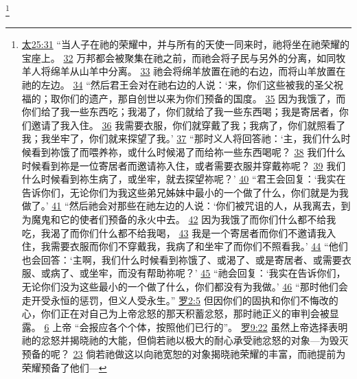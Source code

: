 \documentclass[12pt, a4paper, oneside]{ctexart}
\begin{document}
	\footnote {
		\href{https://biblehub.com/matthew/25-31.htm}{太25:31} “当人子在祂的荣耀中，并与所有的天使一同来时，祂将坐在祂荣耀的宝座上。
		\href{https://biblehub.com/matthew/25-32.htm}{32} 万邦都会被聚集在祂之前，而祂会将子民与另外的分离，如同牧羊人将绵羊从山羊中分离。
		\href{https://biblehub.com/matthew/25-33.htm}{33} 祂会将绵羊放置在祂的右边，而将山羊放置在祂的左边。
		\href{https://biblehub.com/matthew/25-34.htm}{34} “然后君王会对在祂右边的人说：‘来，你们这些被我的圣父祝福的；取你们的遗产，那自创世以来为你们预备的国度。
		\href{https://biblehub.com/matthew/25-35.htm}{35} 因为我饿了，而你们给了我一些东西吃；我渴了，你们就给了我一些东西喝；我是寄居者，你们邀请了我入住。
		\href{https://biblehub.com/matthew/25-36.htm}{36} 我需要衣服，你们就穿戴了我；我病了，你们就照看了我；我坐牢了，你们就来探望了我。’
		\href{https://biblehub.com/matthew/25-37.htm}{37} “那时义人将回答祂：‘主，我们什么时候看到祢饿了而喂养祢，或什么时候渴了而给祢一些东西喝呢？
		\href{https://biblehub.com/matthew/25-38.htm}{38} 我们什么时候看到祢是一位寄居者而邀请祢入住，或者需要衣服并穿戴祢呢？
		\href{https://biblehub.com/matthew/25-39.htm}{39} 我们什么时候看到祢生病了，或坐牢，就去探望祢呢？’
		\href{https://biblehub.com/matthew/25-40.htm}{40} “君王会回复：‘我实在告诉你们，无论你们为我这些弟兄姊妹中最小的一个做了什么，你们就是为我做了。’
		\href{https://biblehub.com/matthew/25-41.htm}{41} “然后祂会对那些在祂左边的人说：‘你们被咒诅的人，从我离去，到为魔鬼和它的使者们预备的永火中去。
		\href{https://biblehub.com/matthew/25-42.htm}{42} 因为我饿了而你们什么都不给我吃，我渴了而你们什么都不给我喝，
		\href{https://biblehub.com/matthew/25-43.htm}{43} 我是一个寄居者而你们不邀请我入住，我需要衣服而你们不穿戴我，我病了和坐牢了而你们不照看我。’
		\href{https://biblehub.com/matthew/25-44.htm}{44} “他们也会回答：‘主啊，我们什么时候看到祢饿了、或渴了、或是寄居者、或需要衣服、或病了、或坐牢，而没有帮助祢呢？’
		\href{https://biblehub.com/matthew/25-45.htm}{45} “祂会回复：‘我实在告诉你们，无论你们没为这些最小的一个做了什么，你们都没有为我做。’
		\href{https://biblehub.com/matthew/25-46.htm}{46} “那时他们会走开受永恒的惩罚，但义人受永生。”
		\href{https://biblehub.com/romans/2-5.htm}{罗2:5} 但因你们的固执和你们不悔改的心，你们正在对自己为上帝忿怒的那天积蓄忿怒，那时祂正义的审判会被显露。
		\href{https://biblehub.com/romans/2-6.htm}{6} 上帝 “会报应各个个体，按照他们已行的”。
		\href{https://biblehub.com/romans/9-22.htm}{罗9:22} 虽然上帝选择表明祂的忿怒并揭晓祂的大能，但倘若祂以极大的耐心承受祂忿怒的对象---为毁灭预备的呢？
		\href{https://biblehub.com/romans/9-23.htm}{23} 倘若祂做这以向祂宽恕的对象揭晓祂荣耀的丰富，而祂提前为荣耀预备了他们---
}
\end{document}
